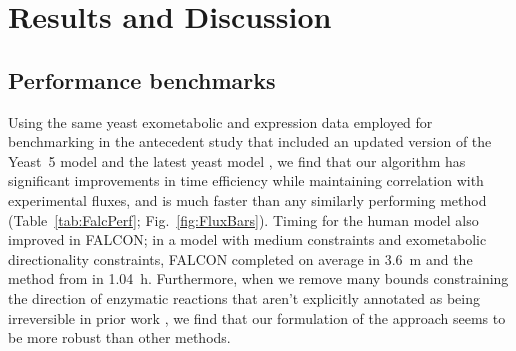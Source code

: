


\section{Results and Discussion}

\subsection{Performance benchmarks}
Using the same yeast exometabolic and expression data employed for
benchmarking in the antecedent study \citep{Lee2012} that included an
updated version of the Yeast~5 model \citep{Heavner2012} and the latest
yeast model \citep{Aung2013}, we find that
our algorithm has significant improvements in time efficiency while
maintaining correlation with experimental fluxes, and is much faster 
than any similarly performing method (Table~\ref{tab:FalcPerf}; 
\suppOrApp Fig.~\ref{fig:FluxBars}).
Timing for the human model also improved in FALCON; in a model with
medium constraints and exometabolic directionality constraints, FALCON
completed on average in 3.6~m and the method from \citealt{Lee2012} in
1.04~h. Furthermore, when we remove many bounds constraining the
direction of enzymatic reactions that aren't explicitly annotated as
being irreversible in prior work \citep{Lee2012}, we find that our
formulation of the approach seems to be more robust than other
methods.


